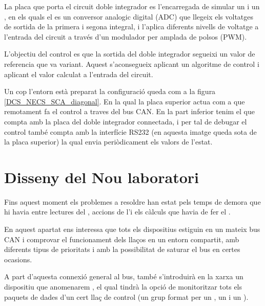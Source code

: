 La placa \FLEX que porta el circuit doble integrador es l'encarregada de simular un \Sensor i un \Actuador, en els quals el \Sensor es un conversor analogic digital (ADC) que llegeix els voltatges de sortida de la primera i segona integral, i l'\Actuador aplica diferents nivells de voltatge a l'entrada del circuit a través d'un modulador per amplada de polsos (PWM).

L'objectiu del control es que la sortida del doble integrador segueixi un valor de referencia que va variant. Aquest s'aconsegueix aplicant un algoritme de control i aplicant el valor calculat a l'entrada del circuit.

Un cop l'entorn està preparat la configuració queda com a la figura \ref{DCS_NECS_SCA_diagonal}. En la qual la placa superior actua com a \Controlador que remotament fa el control a traves del bus CAN. En la part inferior tenim el \SensorActuador que compta amb la placa del doble integrador connectada, i per tal de debugar el control també compta amb la interfície RS232 (en aquesta imatge queda sota de la placa superior) la qual envia periòdicament els valors de l'estat.





\section{Disseny del Nou laboratori}\label{diss:nou}

Fins aquest moment els problemes a resoldre han estat pels temps de demora que hi havia entre lectures del \Sensor, accions de l'\Actuador i els càlculs que havia de fer el \Controlador.

En aquest apartat ens interessa que tots els dispositius estiguin en un mateix bus CAN i comprovar el funcionament dels llaços en un entorn compartit, amb diferents tipus de prioritats i amb la possibilitat de saturar el bus en certes ocasions.

A part d'aquesta connexió general al bus, també s'introduirà en la xarxa un dispositiu que anomenarem \Monitor, el qual tindrà la opció de monitoritzar tots els paquets de dades d'un cert llaç de control (un grup format per un \Sensor, un \Actuador i un \Controlador).

